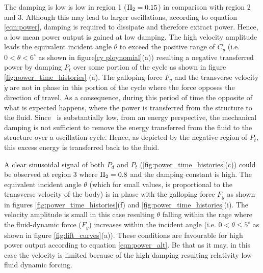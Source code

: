 

The damping is low is low in region 1 ($\Pi_2=0.15$) in comparison with region 2 and 3. Although this may lead to larger oscillations, according to equation \ref{eqn:power}, damping is required to dissipate and therefore extract power. Hence, a low mean power output is gained at low damping. The high velocity amplitude leads the equivalent incident angle $\theta$ to exceed the positive range of $C_y$ (i.e. $0<\theta<6^\circ$ as shown in figure\ref{cy ploynomial}(a)) resulting a negative transferred power by damping $P_t$ over some portion of the cycle as shown in figure \ref{fig:power_time_histories} (a). The galloping force $F_y$ and the transverse velocity $\dot{y}$ are not in phase in this portion of the cycle where the force opposes the direction of travel. As a consequence, during this period of time the opposite of what is expected happens, where the power is transferred from the structure to the fluid. Since \massdamp \ is substantially low, from an energy perspective, the mechanical damping is not sufficient to remove the energy transferred from the fluid to the structure over a oscillation cycle. Hence, as depicted by the negative region of $P_t$, this excess energy is transferred back to the fluid.



A clear sinusoidal signal of both $P_d$ and $P_t$ (\ref{fig:power_time_histories}(c)) could be observed at region 3 where $\Pi_2=0.8$ and the damping constant is high. The equivalent incident angle $\theta$ (which for small values, is proportional to the transverse velocity of the body) is in phase with the galloping force $F_y$ as shown in figures \ref{fig:power_time_histories}(f) and  \ref{fig:power_time_histories}(i). The velocity amplitude is small in this case resulting $\theta$ falling within the rage where the fluid-dynamic force ($F_y$) increases within the incident angle (i.e. $0<\theta \leq 5^\circ$ as shown in figure \ref{fig:lift_curves}(a)). These conditions are favourable for high power output according to equation \ref{eqn:power_alt}. Be that as it may, in this case the velocity is limited because of the high damping resulting relativity low fluid dynamic forcing. 

